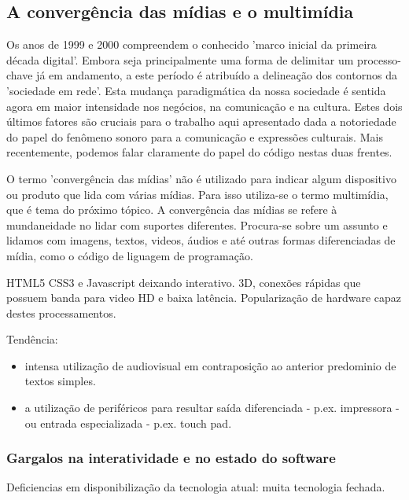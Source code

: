       \subsection{A convergência das mídias e o multimídia}
      \label{sec:midiamultimidia}

      Os anos de 1999 e 2000 compreendem o conhecido 'marco inicial da primeira década digital'.
      Embora seja principalmente uma forma de delimitar um processo-chave já em andamento, a este período é atribuído
      a delineação dos contornos da 'sociedade em rede'. Esta mudança paradigmática da nossa
      sociedade é sentida agora em maior intensidade nos negócios, na comunicação e na cultura. Estes dois
      últimos fatores são cruciais para o trabalho aqui apresentado dada a notoriedade do papel do
      fenômeno sonoro para a comunicação e expressões culturais. Mais recentemente, podemos falar claramente
      do papel do código nestas duas frentes.

      O termo 'convergência das mídias' não é utilizado para indicar algum dispositivo ou produto que
      lida com várias mídias. Para isso utiliza-se o termo multimídia, que é tema do próximo tópico.
      A convergência das mídias se refere à mundaneidade no lidar com suportes diferentes. Procura-se
      sobre um assunto e lidamos com imagens, textos, videos, áudios e até outras formas diferenciadas
      de mídia, como o código de liguagem de programação.


      HTML5 CSS3 e Javascript deixando interativo. 3D, conexões rápidas que possuem banda para video HD e
      baixa latência. Popularização de hardware capaz destes processamentos.

      Tendência:
      \begin{itemize}
	  \item intensa utilização de audiovisual em contraposição ao
      anterior predominio de textos simples.
	  \item a utilização de periféricos para resultar saída diferenciada - p.ex.
      impressora - ou entrada especializada - p.ex. touch pad.
      \end{itemize}


	  \subsubsection{Gargalos na interatividade e no estado do software}
	  \label{sec:gargalos}
	  Deficiencias em disponibilização da tecnologia atual: muita
	  tecnologia fechada.

